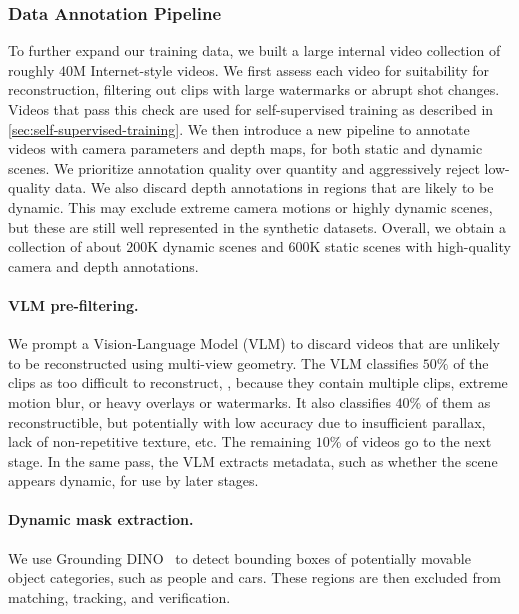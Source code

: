 \subsubsection{Data Annotation Pipeline}%
\label{sec:annotation-pipeline}

To further expand our training data, we built a large internal video collection of roughly $40$M Internet-style videos.
We first assess each video for suitability for reconstruction, \eg filtering out clips with large watermarks or abrupt shot changes.
Videos that pass this check are used for self-supervised training as described in \cref{sec:self-supervised-training}.
We then introduce a new pipeline to annotate videos with camera parameters and depth maps, for both static and dynamic scenes.
We prioritize annotation quality over quantity and aggressively reject low-quality data.
We also discard depth annotations in regions that are likely to be dynamic.
This may exclude extreme camera motions or highly dynamic scenes, but these are still well represented in the synthetic datasets.
Overall, we obtain a collection of about $200$K dynamic scenes and $600$K static scenes with high-quality camera and depth annotations.

\paragraph{VLM pre-filtering.}

We prompt a Vision-Language Model (VLM) to discard videos that are unlikely to be reconstructed using multi-view geometry.
The VLM classifies $50\%$ of the clips as too difficult to reconstruct, \eg, because they contain multiple clips, extreme motion blur, or heavy overlays or watermarks.
It also classifies $40\%$ of them as reconstructible, but potentially with low accuracy due to insufficient parallax, lack of non-repetitive texture, etc.
The remaining $10\%$ of videos go to the next stage.
In the same pass, the VLM extracts metadata, such as whether the scene appears dynamic, for use by later stages.

\paragraph{Dynamic mask extraction.}

We use Grounding DINO~\cite{liu24grounding} to detect bounding boxes of potentially movable object categories, such as people and cars.
These regions are then excluded from matching, tracking, and verification.

